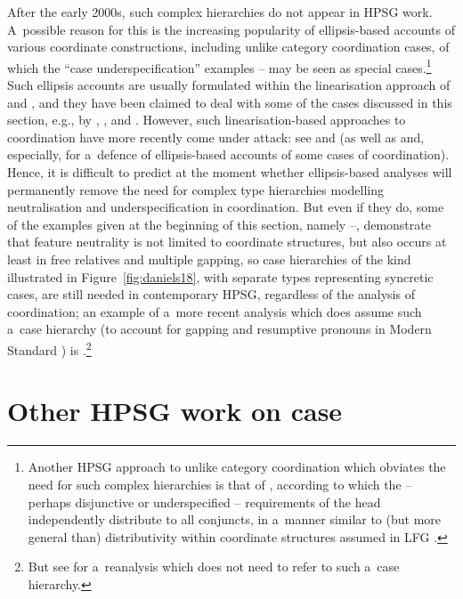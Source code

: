 \documentclass[output=paper
	        ,collection
	        ,collectionchapter
 	        ,biblatex
                ,babelshorthands
                ,newtxmath
                ,draftmode
                ,colorlinks, citecolor=brown
]{langscibook}
\begin{document}
\begin{exe}
\begin{xlist}
\begin{exe}
\begin{xlist}
After the early 2000s, such complex  hierarchies do not appear in HPSG work.  A~possible
reason for this is the increasing popularity of ellipsis-based accounts of various coordinate
constructions, including unlike category coordination cases, of which the “case underspecification”
examples – may be seen as special cases.\footnote{Another HPSG
  approach to unlike category coordination which obviates the need for such complex hierarchies is
  that of \citet{yata:04}, according to which the – perhaps disjunctive or underspecified –
  requirements of the head independently distribute to all conjuncts, in a~manner similar to (but
  more general than) distributivity within coordinate structures assumed in LFG
  \citep{DK2000a,dal:kin:sad:09,prz:pat:12a}.}  Such ellipsis accounts are usually formulated within
the linearisation approach of \citet{Reape92a,Reape94a} and \citet{Kathol95a}, and they have
been claimed to deal with some of the cases discussed in this section, e.g., by
\citet{Crysmann2003c}, \citet{BS2004a}, and \citet{chav:06,chav:08}.  However, such
linearisation-based approaches to coordination have more recently come under attack: see
\citet{levi:11} and \citet{kub:lev:15} (as well as \citealt{yata:12,Yatabe2016a-u} and, especially,
\citealt{yat:wai:18} for a~defence of ellipsis-based accounts of some cases of coordination).
Hence, it is difficult to predict at the moment whether ellipsis-based analyses will permanently
remove the need for complex type hierarchies modelling neutralisation and underspecification in
coordination.  But even if they do, some of the examples given at the beginning of this section,
namely –, demonstrate that feature neutrality is not limited to
coordinate structures, but also occurs at least in free relatives and multiple gapping, so case
hierarchies of the kind illustrated in Figure~\ref{fig:daniels18}, with separate types representing syncretic cases, are still needed in contemporary HPSG, regardless of the analysis of coordination; an example of a~more recent analysis which does assume such a~case hierarchy (to account for gapping and resumptive pronouns in Modern Standard ) is \citet{AB2013a-u}.\footnote{But see \citet{crys:17} for a~reanalysis which does not need to refer to such a~case hierarchy.}



\section{Other HPSG work on case}
\label{sec:case:other}


\end{xlist}
\end{exe}
\end{xlist}
\end{exe}
\end{document}
